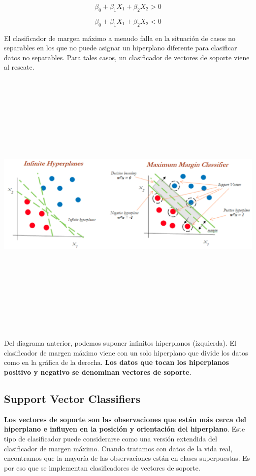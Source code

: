 \documentclass[
]{book}
\begin{document}
\[\beta_0 + \beta_1X_1 + \beta_2X_2>0\]

\[\beta_0 + \beta_1X_1 + \beta_2X_2<0\]

El clasificador de margen máximo a menudo falla en la situación de casos no separables en los que no puede asignar un hiperplano diferente para clasificar datos no separables. Para tales casos, un clasificador de vectores de soporte viene al rescate.

\begin{center}\includegraphics[width=900pt,height=380pt]{img/03-svm/02_maximum_margin_classifier} \end{center}

Del diagrama anterior, podemos suponer infinitos hiperplanos (izquierda). El clasificador de margen máximo viene con un solo hiperplano que divide los datos como en la gráfica de la derecha. \textbf{Los datos que tocan los hiperplanos positivo y negativo se denominan vectores de soporte}.

\hypertarget{support-vector-classifiers}{%
\subsection{Support Vector Classifiers}\label{support-vector-classifiers}}

\textbf{Los vectores de soporte son las observaciones que están más cerca del hiperplano e influyen en la posición y orientación del hiperplano}. Este tipo de clasificador puede considerarse como una versión extendida del clasificador de margen máximo. Cuando tratamos con datos de la vida real, encontramos que la mayoría de las observaciones están en clases superpuestas. Es por eso que se implementan clasificadores de vectores de soporte.
\end{document}
